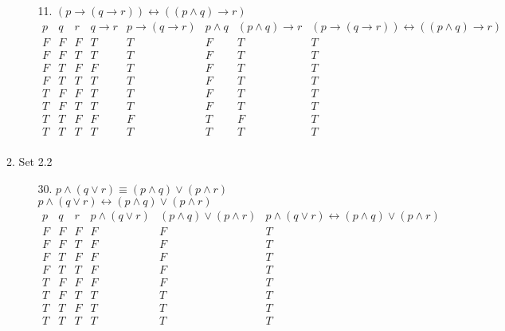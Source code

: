 \documentclass[letterpaper]{article}
\begin{document}
\begin{enumerate}
\begin{enumerate}
\begin{itemize}
				\item [11.]
				$\left( p \rightarrow \left( q \rightarrow r \right) \right) \leftrightarrow \left( \left( p \wedge q \right) \rightarrow r \right)$ \\
				$\begin{array}{c|c|c|c|c|c|c|c}
					p & q & r & q \rightarrow r & p \rightarrow \left( q \rightarrow r \right) & p \wedge q & \left( p \wedge q \right) \rightarrow r & \left( p \rightarrow \left( q \rightarrow r \right) \right) \leftrightarrow \left( \left( p \wedge q \right) \rightarrow r \right) \\ \hline
					F & F & F & T & T & F & T & T \\ \hline
					F & F & T & T & T & F & T & T \\ \hline
					F & T & F & F & T & F & T & T \\ \hline
					F & T & T & T & T & F & T & T \\ \hline
					T & F & F & T & T & F & T & T \\ \hline
					T & F & T & T & T & F & T & T \\ \hline
					T & T & F & F & F & T & F & T \\ \hline
					T & T & T & T & T & T & T & T \\ 
				\end{array}$
			\end{itemize}
			
			\item Set 2.2
			\begin{itemize}
				\item [30.]
				$p \wedge \left( q \vee r \right) \equiv \left( p \wedge q \right) \vee \left( p \wedge r \right)$ \\
				$p \wedge \left( q \vee r \right) \leftrightarrow \left( p \wedge q \right) \vee \left( p \wedge r \right)$ \\
				$\begin{array}{c|c|c|c|c|c}
					p & q & r & p \wedge \left( q \vee r \right) & \left( p \wedge q \right) \vee \left( p \wedge r \right) & p \wedge \left( q \vee r \right) \leftrightarrow \left( p \wedge q \right) \vee \left( p \wedge r \right) \\ \hline
					F & F & F & F & F & T \\ \hline
					F & F & T & F & F & T \\ \hline
					F & T & F & F & F & T \\ \hline
					F & T & T & F & F & T \\ \hline
					T & F & F & F & F & T \\ \hline
					T & F & T & T & T & T \\ \hline
					T & T & F & T & T & T \\ \hline
					T & T & T & T & T & T \\ 
				\end{array}$
				

\end{itemize}
\end{enumerate}
\end{enumerate}
\end{document}
